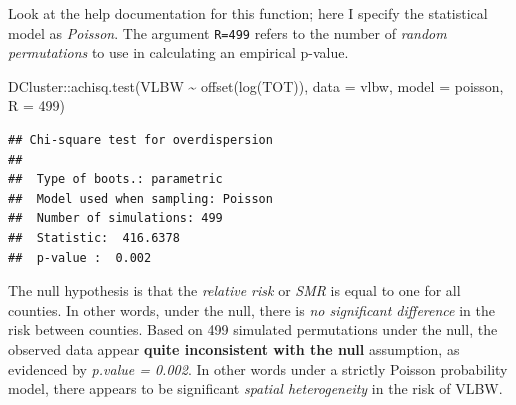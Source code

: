 \documentclass[
]{book}
\newenvironment{Shaded}{\begin{snugshade}}{\end{snugshade}}
\newcommand{\AttributeTok}[1]{\textcolor[rgb]{0.77,0.63,0.00}{#1}}
\newcommand{\DecValTok}[1]{\textcolor[rgb]{0.00,0.00,0.81}{#1}}
\newcommand{\FunctionTok}[1]{\textcolor[rgb]{0.00,0.00,0.00}{#1}}
\newcommand{\NormalTok}[1]{#1}
\newcommand{\SpecialCharTok}[1]{\textcolor[rgb]{0.00,0.00,0.00}{#1}}
\newcommand{\StringTok}[1]{\textcolor[rgb]{0.31,0.60,0.02}{#1}}
\begin{document}
Look at the help documentation for this function; here I specify the statistical model as \emph{Poisson}. The argument \texttt{R=499} refers to the number of \emph{random permutations} to use in calculating an empirical p-value.

\begin{Shaded}
\begin{Highlighting}[]
\NormalTok{DCluster}\SpecialCharTok{::}\FunctionTok{achisq.test}\NormalTok{(VLBW }\SpecialCharTok{\textasciitilde{}} \FunctionTok{offset}\NormalTok{(}\FunctionTok{log}\NormalTok{(TOT)), }
                      \AttributeTok{data =}\NormalTok{ vlbw, }
                      \AttributeTok{model =} \StringTok{\textquotesingle{}poisson\textquotesingle{}}\NormalTok{,}
                      \AttributeTok{R =} \DecValTok{499}\NormalTok{)}
\end{Highlighting}
\end{Shaded}

\begin{verbatim}
## Chi-square test for overdispersion 
## 
##  Type of boots.: parametric 
##  Model used when sampling: Poisson 
##  Number of simulations: 499 
##  Statistic:  416.6378 
##  p-value :  0.002
\end{verbatim}

The null hypothesis is that the \emph{relative risk} or \emph{SMR} is equal to one for all counties. In other words, under the null, there is \emph{no significant difference} in the risk between counties. Based on 499 simulated permutations under the null, the observed data appear \textbf{quite inconsistent with the null} assumption, as evidenced by \emph{p.value = 0.002}. In other words under a strictly Poisson probability model, there appears to be significant \emph{spatial heterogeneity} in the risk of VLBW.
\end{document}
